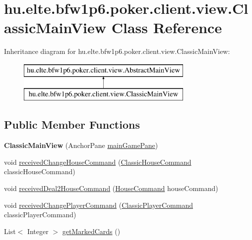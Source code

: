 \hypertarget{classhu_1_1elte_1_1bfw1p6_1_1poker_1_1client_1_1view_1_1_classic_main_view}{}\section{hu.\+elte.\+bfw1p6.\+poker.\+client.\+view.\+Classic\+Main\+View Class Reference}
\label{classhu_1_1elte_1_1bfw1p6_1_1poker_1_1client_1_1view_1_1_classic_main_view}
Inheritance diagram for hu.\+elte.\+bfw1p6.\+poker.\+client.\+view.\+Classic\+Main\+View\+:\begin{figure}[H]
\begin{center}
\leavevmode
\includegraphics[height=2.000000cm]{classhu_1_1elte_1_1bfw1p6_1_1poker_1_1client_1_1view_1_1_classic_main_view}
\end{center}
\end{figure}
\subsection*{Public Member Functions}
\begin{DoxyCompactItemize}
\item 
\hypertarget{classhu_1_1elte_1_1bfw1p6_1_1poker_1_1client_1_1view_1_1_classic_main_view_a17a6f6837a484fc22de7a3c5387eee91}{}{\bfseries Classic\+Main\+View} (Anchor\+Pane \hyperlink{classhu_1_1elte_1_1bfw1p6_1_1poker_1_1client_1_1view_1_1_abstract_main_view_ad9a49e46e49fe5dfb4c4847e961b31cf}{main\+Game\+Pane})\label{classhu_1_1elte_1_1bfw1p6_1_1poker_1_1client_1_1view_1_1_classic_main_view_a17a6f6837a484fc22de7a3c5387eee91}

\item 
void \hyperlink{classhu_1_1elte_1_1bfw1p6_1_1poker_1_1client_1_1view_1_1_classic_main_view_a2211a9f1559e79e6081a1589f90c1b18}{received\+Change\+House\+Command} (\hyperlink{classhu_1_1elte_1_1bfw1p6_1_1poker_1_1command_1_1classic_1_1_classic_house_command}{Classic\+House\+Command} classic\+House\+Command)
\item 
void \hyperlink{classhu_1_1elte_1_1bfw1p6_1_1poker_1_1client_1_1view_1_1_classic_main_view_a60af25852e0a4ec1c39b83eca420c813}{received\+Deal2\+House\+Command} (\hyperlink{classhu_1_1elte_1_1bfw1p6_1_1poker_1_1command_1_1_house_command}{House\+Command} house\+Command)
\item 
void \hyperlink{classhu_1_1elte_1_1bfw1p6_1_1poker_1_1client_1_1view_1_1_classic_main_view_ae60dfa7f81fc2e5ae7c11c302f8b6633}{received\+Change\+Player\+Command} (\hyperlink{classhu_1_1elte_1_1bfw1p6_1_1poker_1_1command_1_1classic_1_1_classic_player_command}{Classic\+Player\+Command} classic\+Player\+Command)
\item 
List$<$ Integer $>$ \hyperlink{classhu_1_1elte_1_1bfw1p6_1_1poker_1_1client_1_1view_1_1_classic_main_view_a8a045af3925309f14df8bf03dc44ff6e}{get\+Marked\+Cards} ()
\end{DoxyCompactItemize}
